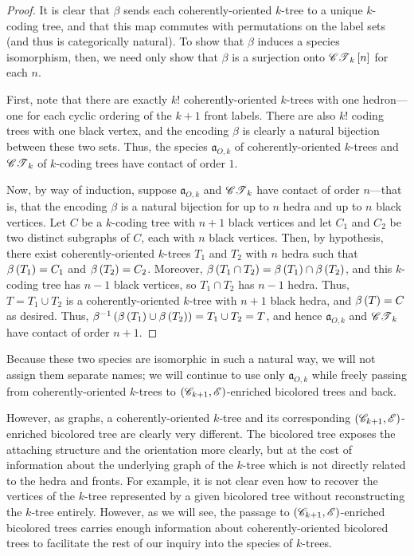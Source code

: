 \documentclass[sectionflow,singlespace,twoside,boldmathhdr]{brandiss} %
\numberwithin{section}{chapter}
\numberwithin{figure}{chapter}
\begin{document}
\begin{proof}
  It is clear that $\beta$ sends each coherently-oriented $k$-tree to a unique $k$-coding tree, and that this map commutes with permutations on the label sets (and thus is categorically natural).
  To show that $\beta$ induces a species isomorphism, then, we need only show that $\beta$ is a surjection onto $\mathscr{CT}_{k} \left[ {n} \right]$ for each $n$.
  
  First, note that there are exactly $k!$ coherently-oriented $k$-trees with one hedron---one for each cyclic ordering of the $k+1$ front labels.
  There are also $k!$ coding trees with one black vertex, and the encoding $\beta$ is clearly a natural bijection between these two sets.
  Thus, the species $\mathfrak{a}_{O,k}$ of coherently-oriented $k$-trees and $\mathscr{CT}_{k}$ of $k$-coding trees have contact of order $1$.

  Now, by way of induction, suppose $\mathfrak{a}_{O, k}$ and $\mathscr{CT}_{k}$ have contact of order $n$---that is, that the encoding $\beta$ is a natural bijection for up to $n$ hedra and up to $n$ black vertices.
  Let $C$ be a $k$-coding tree with $n+1$ black vertices and let $C_{1}$ and $C_{2}$ be two distinct subgraphs of $C$, each with $n$ black vertices.
  Then, by hypothesis, there exist coherently-oriented $k$-trees $T_{1}$ and $T_{2}$ with $n$ hedra such that $\beta \left( {T_{1}} \right) = C_{1}$ and $\beta \left( {T_{2}} \right) = C_{2}$.
  Moreover, $\beta \left( {T_{1} \cap T_{2}} \right) = \beta \left( {T_{1}} \right) \cap \beta \left( {T_{2}} \right)$, and this $k$-coding tree has $n-1$ black vertices, so $T_{1} \cap T_{2}$ has $n-1$ hedra.
  Thus, $T = T_{1} \cup T_{2}$ is a coherently-oriented $k$-tree with $n+1$ black hedra, and $\beta \left( {T} \right) = C$ as desired.
  Thus, $\beta^{-1} \left( {\beta \left( {T_{1}} \right) \cup \beta \left( {T_{2}} \right)} \right) = T_{1} \cup T_{2} = T$, and hence $\mathfrak{a}_{O, k}$ and $\mathscr{CT}_{k}$ have contact of order $n+1$.
\end{proof}

Because these two species are isomorphic in such a natural way, we will not assign them separate names; we will continue to use only $\mathfrak{a}_{O, k}$ while freely passing from coherently-oriented $k$-trees to $\left( {\mathscr{C}_{k+1}, \mathscr{E}} \right)$-enriched bicolored trees and back.

However, as graphs, a coherently-oriented $k$-tree and its corresponding $\left( {\mathscr{C}_{k+1}, \mathscr{E}} \right)$-enriched bicolored tree are clearly very different.
The bicolored tree exposes the attaching structure and the orientation more clearly, but at the cost of information about the underlying graph of the $k$-tree which is not directly related to the hedra and fronts.
For example, it is not clear even how to recover the vertices of the $k$-tree represented by a given bicolored tree without reconstructing the $k$-tree entirely.
However, as we will see, the passage to $\left( {\mathscr{C}_{k+1}, \mathscr{E}} \right)$-enriched bicolored trees carries enough information about coherently-oriented bicolored trees to facilitate the rest of our inquiry into the species of $k$-trees.
\end{document}
